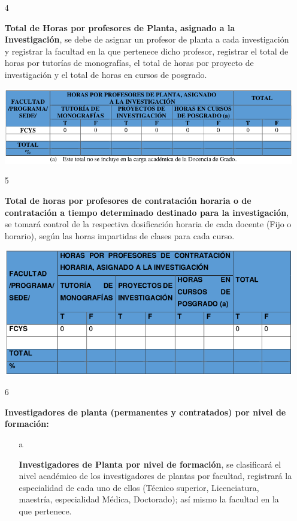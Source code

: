 \documentclass[12pt,letterpaper]{report}
\newcommand{\mb}{\vspace{0.5cm}}
\begin{document}
\begin{itemize}
\mb
\item[4]{
\textbf{Total de Horas por profesores de Planta, asignado a la Investigación}, se debe de asignar un profesor de planta a cada investigación y registrar la facultad en la que pertenece dicho profesor, registrar el total de horas por tutorías de monografías, el total de horas por proyecto de investigación y el total de horas en cursos de posgrado.

\mb
\centering
	\includegraphics[width=\textwidth]{img/tabla4.png}\par
\mb
}


\item[5]{
\textbf{Total de horas por profesores de contratación horaria o de contratación a tiempo determinado destinado para la investigación}, se tomará control de la respectiva dosificación horaria de cada docente (Fijo o horario), según las horas impartidas de clases para cada curso.

\mb
\centering
	\includegraphics[width=\textwidth]{img/tabla5.png}\par
\mb
}


\item[6]{
\textbf{Investigadores de planta (permanentes y contratados) por nivel de formación:}

\begin{itemize}
\item[a]{
\textbf{Investigadores de Planta por nivel de formación}, se clasificará el nivel académico de los investigadores de plantas por facultad, registrará la especialidad de cada uno de ellos (Técnico superior, Licenciatura, maestría, especialidad Médica, Doctorado); así mismo la facultad en la que pertenece.

}
\end{itemize}}
\end{itemize}
\end{document}
